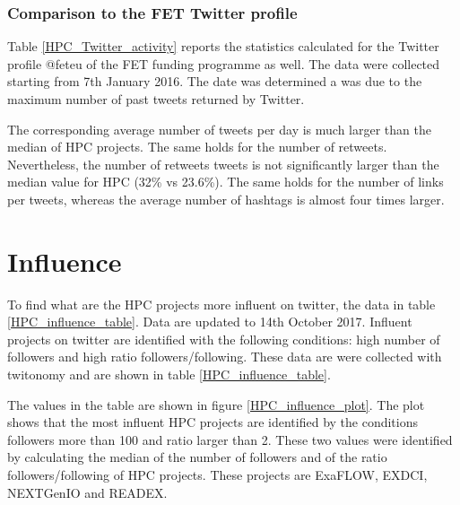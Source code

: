 \subsubsection{Comparison to the FET Twitter profile}
Table \ref{HPC_Twitter_activity} reports the statistics calculated for the Twitter profile @fet\textunderscore eu of the FET funding programme as well. The data were collected starting from 7th January 2016. The date was determined a was due to the maximum number of past tweets returned by Twitter. 

The corresponding average number of tweets per day is much larger than the median of HPC projects. The same holds for the number of retweets.  Nevertheless, the number of retweets tweets is not significantly larger than the median value for HPC (32\% vs 23.6\%). The same holds for the number of links per tweets, whereas the average number of hashtags is almost four times larger.

\section{Influence} \label{Influence}
To find what are the HPC projects more influent on twitter, the data in table \ref{HPC_influence_table}. Data are updated to 14th October 2017. Influent projects on twitter are identified with the following conditions: high number of followers and high ratio followers/following. These data are were collected with twitonomy and are shown in table \ref{HPC_influence_table}.

The values in the table are shown in figure \ref{HPC_influence_plot}. The plot shows that the most influent HPC projects are identified by the conditions followers more than 100 and ratio larger than 2. These two values were identified by calculating the median of the number of followers and of the ratio followers/following of HPC projects. These projects are ExaFLOW, EXDCI, NEXTGenIO and READEX.

